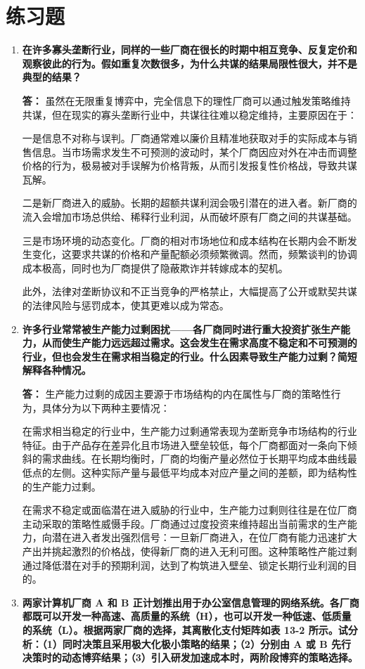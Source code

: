 	\section{练习题}
	\begin{enumerate}[label=\textbf{\arabic*.}, leftmargin=*]
		\item \textbf{在许多寡头垄断行业，同样的一些厂商在很长的时期中相互竞争、反复定价和观察彼此的行为。假如重复次数很多，为什么共谋的结果局限性很大，并不是典型的结果？}
		
		\textbf{答：}
		虽然在无限重复博弈中，完全信息下的理性厂商可以通过触发策略维持共谋，但在现实的寡头垄断行业中，共谋往往难以稳定维持，主要原因在于：
		
		一是信息不对称与误判。厂商通常难以廉价且精准地获取对手的实际成本与销售信息。当市场需求发生不可预测的波动时，某个厂商因应对外在冲击而调整价格的行为，极易被对手误解为价格背叛，从而引发报复性价格战，导致共谋瓦解。
		
		二是新厂商进入的威胁。长期的超额共谋利润会吸引潜在的进入者。新厂商的流入会增加市场总供给、稀释行业利润，从而破坏原有厂商之间的共谋基础。
		
		三是市场环境的动态变化。厂商的相对市场地位和成本结构在长期内会不断发生变化，这要求共谋的价格和产量配额必须频繁微调。然而，频繁谈判的协调成本极高，同时也为厂商提供了隐蔽欺诈并转嫁成本的契机。
		
		此外，法律对垄断协议和不正当竞争的严格禁止，大幅提高了公开或默契共谋的法律风险与惩罚成本，使其更难以成为常态。
		
		\item \textbf{许多行业常常被生产能力过剩困扰——各厂商同时进行重大投资扩张生产能力，从而使生产能力远远超过需求。这会发生在需求高度不稳定和不可预测的行业，但也会发生在需求相当稳定的行业。什么因素导致生产能力过剩？简短解释各种情况。}
		
		\textbf{答：}
		生产能力过剩的成因主要源于市场结构的内在属性与厂商的策略性行为，具体分为以下两种主要情况：
		
		在需求相当稳定的行业中，生产能力过剩通常表现为垄断竞争市场结构的行业特征。由于产品存在差异化且市场进入壁垒较低，每个厂商都面对一条向下倾斜的需求曲线。在长期均衡时，厂商的均衡产量必然位于长期平均成本曲线最低点的左侧。这种实际产量与最低平均成本对应产量之间的差额，即为结构性的生产能力过剩。
		
		在需求不稳定或面临潜在进入威胁的行业中，生产能力过剩则往往是在位厂商主动采取的策略性威慑手段。厂商通过过度投资来维持超出当前需求的生产能力，向潜在进入者发出强烈信号：一旦新厂商进入，在位厂商有能力迅速扩大产出并挑起激烈的价格战，使得新厂商的进入无利可图。这种策略性产能过剩通过降低潜在对手的预期利润，达到了构筑进入壁垒、锁定长期行业利润的目的。
		\newpage
		\item \textbf{两家计算机厂商 A 和 B 正计划推出用于办公室信息管理的网络系统。各厂商都既可以开发一种高速、高质量的系统（H），也可以开发一种低速、低质量的系统（L）。根据两家厂商的选择，其离散化支付矩阵如表 13-2 所示。试分析：（1）同时决策且采用极大化极小策略的结果；（2）分别由 A 或 B 先行决策时的动态博弈结果；（3）引入研发加速成本时，两阶段博弈的策略选择。}
		

\end{enumerate}
